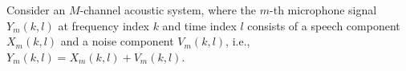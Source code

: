 \documentclass{article}
\begin{document}
\label{sec:mwf}
Consider an $M$-channel acoustic system, where the $m$-th microphone signal $Y_m(k,l)$ at frequency index $k$ and time index $l$ consists of a speech component $X_m(k,l)$ and a noise component $V_m(k,l)$, i.e.,~$Y_m(k,l) = X_m(k,l) + V_m(k,l)$.
\end{document}
